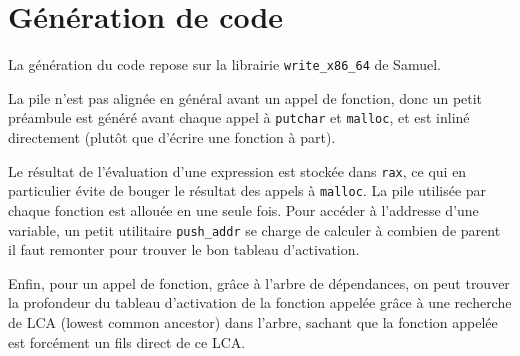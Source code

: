 \documentclass{scrartcl}
\begin{document}
\section*{Génération de code}
La génération du code repose sur la librairie \verb|write_x86_64| de Samuel.\par
La pile n'est pas alignée en général avant un appel de fonction, donc un petit
préambule est généré avant chaque appel à \verb|putchar| et \verb|malloc|, et
est inliné directement (plutôt que d'écrire une fonction à part).\par
Le résultat de l'évaluation d'une expression est stockée dans \verb|rax|, ce qui
en particulier évite de bouger le résultat des appels à \verb|malloc|. La pile
utilisée par chaque fonction est allouée en une seule fois. Pour accéder à l'addresse
d'une variable, un petit utilitaire \verb|push_addr| se charge de calculer à combien de parent
il faut remonter pour trouver le bon tableau d'activation.\par
Enfin, pour un appel de fonction,
grâce à l'arbre de dépendances, on peut trouver la profondeur du tableau d'activation de la
fonction appelée grâce à une recherche de LCA (lowest common ancestor) dans l'arbre, sachant
que la fonction appelée est forcément un fils direct de ce LCA.
\end{document}
